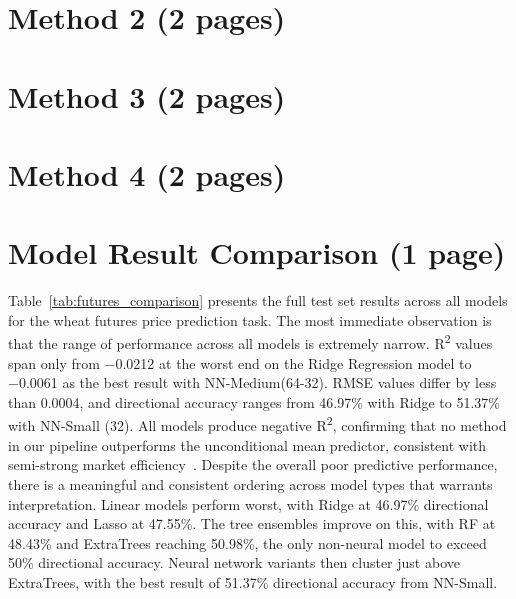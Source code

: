 \documentclass[pdflatex,sn-mathphys-num, oneside]{sn-jnl}%
\theoremstyle{thmstyleone}%
\theoremstyle{thmstyletwo}%
\theoremstyle{thmstylethree}%
\begin{document}
\clearpage

\section{Method 2 (2 pages)}\label{sec3}

\clearpage

\section{Method 3 (2 pages)}\label{sec3}

\clearpage

\section{Method 4 (2 pages)}\label{sec3}

\clearpage

\section{Model Result Comparison (1 page)}\label{sec3}
Table~\ref{tab:futures_comparison} presents the full test set results across all models for the wheat futures price prediction task. The most immediate observation is that the range of performance across all models is extremely narrow. R\textsuperscript{2} values span only from −0.0212 at the worst end on the Ridge Regression model to −0.0061 as the best result with NN-Medium(64-32). RMSE values differ by less than 0.0004, and directional accuracy ranges from 46.97\% with Ridge to 51.37\% with NN-Small (32). All models produce negative R\textsuperscript{2}, confirming that no method in our pipeline outperforms the unconditional mean predictor, consistent with semi-strong market efficiency~\cite{bib30}. Despite the overall poor predictive performance, there is a meaningful and consistent ordering across model types that warrants interpretation. Linear models perform worst, with Ridge at 46.97\% directional accuracy and Lasso at 47.55\%. The tree ensembles improve on this, with RF at 48.43\% and ExtraTrees reaching 50.98\%, the only non-neural model to exceed 50\% directional accuracy. Neural network variants then cluster just above ExtraTrees, with the best result of 51.37\% directional accuracy from NN-Small.
\end{document}
